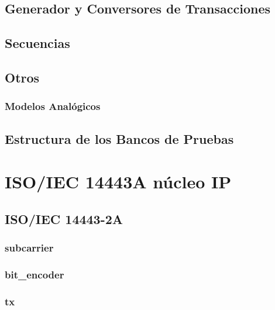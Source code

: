 \documentclass[a4paper, twoside, 11pt]{report}
\begin{document}
\FloatBarrier
\subsection{Generador y Conversores de Transacciones}

\FloatBarrier
\subsection{Secuencias}

\FloatBarrier
\subsection{Otros}

\FloatBarrier
\subsubsection{Modelos Analógicos}

\FloatBarrier
\subsection{Estructura de los Bancos de Pruebas}

\FloatBarrier
\section{ISO/IEC 14443A núcleo IP}

\FloatBarrier
\subsection{ISO/IEC 14443-2A}

\FloatBarrier
\subsubsection{subcarrier}

\FloatBarrier
\subsubsection{bit\_encoder}

\FloatBarrier
\subsubsection{tx}
\end{document}
